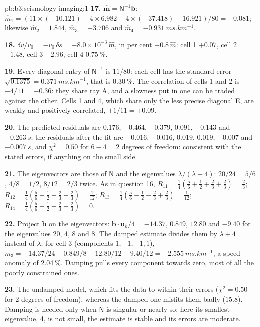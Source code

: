 \begin{solution}{pb:b3:seismology-imaging:1}
\textbf{17.} $\hat{\mathbf m} = \mathsf N^{-1}\mathbf b$:
$\hat m_1 = (11\times(-10.121) - 4\times6.982 - 4\times(-37.418) - 16.921)/80
= -0.081$; likewise $\hat m_2 = 1.844$, $\hat m_3 = -3.706$ and
$\hat m_4 = \qty{-0.931}{ms.km^{-1}}$.

\textbf{18.} $\delta v/v_0 = -v_0\,\delta s = -8.0\times10^{-3}\,\hat m$, in per
cent $-0.8\,\hat m$: cell 1 $+0.07$, cell 2 $-1.48$, cell 3 $+2.96$, cell 4
$\qty{+0.75}{\percent}$.

\textbf{19.} Every diagonal entry of $\mathsf N^{-1}$ is $11/80$: each cell has
the standard error $\sqrt{0.1375} = \qty{0.371}{ms.km^{-1}}$, that is
$\qty{0.30}{\percent}$. The correlation of cells 1 and 2 is $-4/11 = -0.36$:
they share ray A, and a slowness put in one can be traded against the other.
Cells 1 and 4, which share only the less precise diagonal E, are weakly and
positively correlated, $+1/11 = +0.09$.

\textbf{20.} The predicted residuals are $0.176$, $-0.464$, $-0.379$, $0.091$,
$-0.143$ and $\qty{-0.263}{s}$; the residuals after the fit are $-0.016$,
$-0.016$, $0.019$, $0.019$, $-0.007$ and $\qty{-0.007}{s}$, and
$\chi^2 = 0.50$ for $6 - 4 = 2$ degrees of freedom: consistent with the stated
errors, if anything on the small side.

\textbf{21.} The eigenvectors are those of $\mathsf N$ and the eigenvalues
$\lambda/(\lambda + 4)$: $20/24 = 5/6$, $4/8 = 1/2$, $8/12 = 2/3$ twice. As in
question 16, $R_{11} = \tfrac14(\tfrac56 + \tfrac12 + \tfrac23 + \tfrac23) =
\tfrac23$; $R_{12} = \tfrac14(\tfrac56 - \tfrac12 + \tfrac23 - \tfrac23) =
\tfrac1{12}$; $R_{13} = \tfrac14(\tfrac56 - \tfrac12 - \tfrac23 + \tfrac23) =
\tfrac1{12}$; $R_{14} = \tfrac14(\tfrac56 + \tfrac12 - \tfrac23 - \tfrac23) = 0$.

\textbf{22.} Project $\mathbf b$ on the eigenvectors: $\mathbf b\cdot\mathbf u_k/4
= -14.37$, $0.849$, $12.80$ and $-9.40$ for the eigenvalues 20, 4, 8 and 8.
The damped estimate divides them by $\lambda + 4$ instead of $\lambda$; for
cell 3 (components $1, -1, -1, 1$),
$m_3 = -14.37/24 - 0.849/8 - 12.80/12 - 9.40/12 = \qty{-2.555}{ms.km^{-1}}$,
a speed anomaly of $\qty{+2.04}{\percent}$. Damping pulls every component
towards zero, most of all the poorly constrained ones.

\textbf{23.} The undamped model, which fits the data to within their errors
($\chi^2 = 0.50$ for 2 degrees of freedom), whereas the damped one misfits them
badly ($15.8$). Damping is needed only when $\mathsf N$ is singular or nearly
so; here its smallest eigenvalue, 4, is not small, the estimate is stable and
its errors are moderate.


\end{solution}
